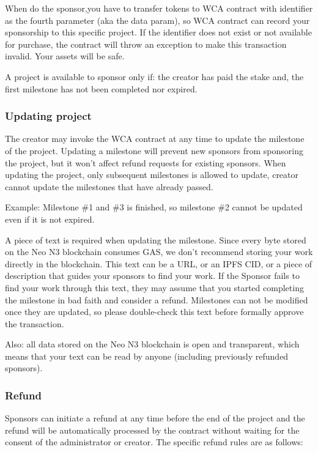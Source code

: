\documentclass[12pt,a4paper]{article}
\begin{document}
    When do the sponsor,you have to transfer tokens to WCA contract with identifier
    as the fourth parameter (aka the data param), so WCA contract can record your
    sponsorship to this specific project. If the identifier does not exist or not
    available for purchase, the contract will throw an exception to make this
    transaction invalid. Your assets will be safe.

    A project is available to sponsor only if:
    the creator has paid the stake and, the first milestone has not been completed nor expired.

    \subsubsection{Updating project}

    The creator may invoke the WCA contract at any time to update the milestone of the project.
    Updating a milestone will prevent new sponsors from sponsoring the project,
    but it won't affect refund requests for existing sponsors.
    When updating the project, only subsequent milestones is allowed to update,
    creator cannot update the milestones that have already passed.

    Example: Milestone \#1 and \#3 is finished, so milestone \#2 cannot be updated
    even if it is not expired.

    A piece of text is required when updating the milestone. Since every byte stored
    on the Neo N3 blockchain consumes GAS, we don't recommend storing your work
    directly in the blockchain. This text can be a URL, or an IPFS CID, or a piece of
    description that guides your sponsors to find your work. If the Sponsor fails to
    find your work through this text, they may assume that you started completing the
    milestone in bad faith and consider a refund. Milestones can not be modified once
    they are updated, so please double-check this text before formally approve the transaction.

    Also: all data stored on the Neo N3 blockchain is open and transparent, which means
    that your text can be read by anyone (including previously refunded sponsors).

    \subsubsection{Refund}

    Sponsors can initiate a refund at any time before the end of the project
    and the refund will be automatically processed by the contract without
    waiting for the consent of the administrator or creator.
    The specific refund rules are as follows:
\end{document}
